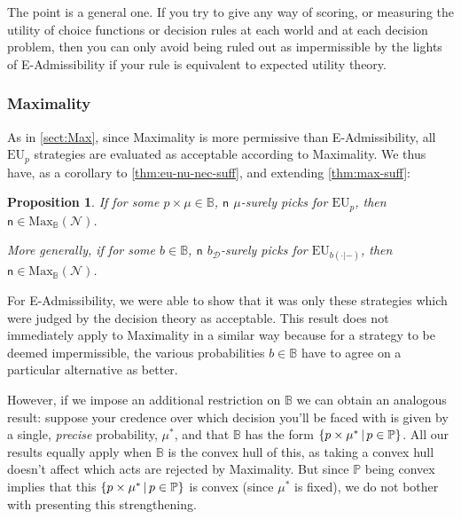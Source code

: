 \documentclass[a4paper]{article}
\newtheorem{proposition}[theorem]{Proposition}
\renewcommand\P{\mathbb{P}} %
\newcommand\EU{\mathrm{EU}}
\newcommand\Maximality{\mathrm{Max}}
\newcommand{\Decs}{\mathcal{D}}
\newcommand{\n}{\mathsf{n}}
\newcommand\Nu{\mathcal{N}}
\newcommand{\IB}{\mathbb{B}}
\newcommand{\IP}{\P}
\newcommand{\todoold}[2][]{\todo[backgroundcolor=white,bordercolor=orange!10,linecolor=gray!10, #1,caption={},textcolor=gray]{Pre-rev: #2}}
\newcommand{\todooldinfo}[2][]{\todoold[#1]{#2}}
\newcommand\SetDelimiter[1][]{
	\nonscript\,#1\vert \allowbreak \nonscript\,\mathopen{}}
\providecommand\given{\SetDelimiter}
\newenvironment{CCM rewritten}
{\begingroup\color{blue}} %
{\endgroup}              %
\begin{document}
	The point is a general one.  If you try to give any way of scoring, or measuring the utility of choice functions or decision rules at each world and at each decision problem, then you can only avoid being ruled out as impermissible by the lights of E-Admissibility if your rule is equivalent to expected utility theory. 


\subsubsection{Maximality}\label{sect:nu:Max}


As in \cref{sect:Max}, since Maximality is more permissive than E-Admissibility, all $\EU_p$ strategies are evaluated as acceptable according to Maximality. We thus have, as a corollary to \cref{thm:eu-nu-nec-suff}, and extending \cref{thm:max-suff}:
\begin{proposition}\label{thm:max-nu-suff}
		If for some $p\times\mu\in \IB$, $\n$ $\mu$-surely picks for $\EU_{p}$, then $\n\in\Maximality_\IB(\Nu)$. 
		
		More generally, if for some $b\in \IB$, $\n$ $b_\Decs$-surely picks for $\EU_{b(\cdot|-)}$, then $\n\in\Maximality_\IB(\Nu)$. 
\end{proposition}

For E-Admissibility, we were able to show that it was only these strategies which were judged by the decision theory as acceptable. This result does not immediately apply to Maximality in a similar way because for a strategy to be deemed impermissible, the various probabilities $b\in \IB$ have to agree on a particular alternative as better.

However, if we impose an additional restriction on $\IB$ we can obtain an analogous result: suppose your credence over which decision you'll be faced with is given by a single, \emph{precise} probability, $\mu^*$, and that $\IB$ has the form $\{p\times \mu^*\given p\in \IP\}$. All our results equally apply when $\IB$ is the convex hull of this, as taking a convex hull doesn't affect which acts are rejected by Maximality. But since $\IP$ being convex implies that this $\{p\times\mu^*\given p\in\IP\}$ is convex (since $\mu^*$ is fixed), we do not bother with presenting this strengthening. 
\todoold{check!!!}
\end{document}
